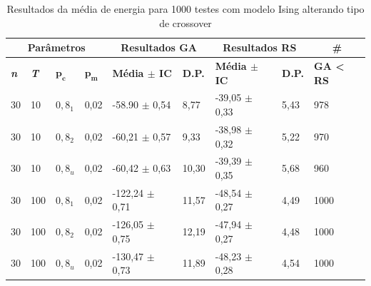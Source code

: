 \begin{table}[h!]
	\centering
	\begin{tabular}{|l|l|l|l|l|l|l|l|l|}
		\hline
		\multicolumn{4}{|c|}{\textbf{Parâmetros}}                                                    & \multicolumn{2}{c|}{\textbf{Resultados GA}}                                        & \multicolumn{2}{c|}{\textbf{Resultados RS}}                                        & \multicolumn{1}{c|}{\textbf{\#}}                      \\ \hline
		\textbf{\textit{n}} & \textbf{\textit{T}} & $\bm{p_c}$ & $\bm{p_m}$ & \textbf{Média $\pm$ IC} & \textbf{D.P.} & \textbf{Média $\pm$ IC} & \textbf{D.P.} & \textbf{GA < RS} \\ \hline
		30                          & 10                          & $0,8_1$    & 0,02       & -58.90 $\pm$ 0,54                            & 8,77                           & -39,05 $\pm$ 0,33                            & 5,43                           & 978                                          \\ \hline
		30                          & 10                          & $0,8_2$    & 0,02       & -60,21 $\pm$ 0,57                            & 9,33                           & -38,98 $\pm$ 0,32                            & 5,22                           & 970                                          \\ \hline
		30                          & 10                          & $0,8_u$    & 0,02       & -60,42 $\pm$ 0,63                            & 10,30                          & -39,39 $\pm$ 0,35                            & 5,68                           & 960                                          \\ \hline
		30                          & 100                         & $0,8_1$    & 0,02       & -122,24 $\pm$ 0,71                           & 11,57                          & -48,54 $\pm$ 0,27                            & 4,49                           & 1000                                         \\ \hline
		30                          & 100                         & $0,8_2$    & 0,02       & -126,05 $\pm$ 0,75                           & 12,19                          & -47,94 $\pm$ 0,27                            & 4,48                           & 1000                                         \\ \hline
		30                          & 100                         & $0,8_u$    & 0,02       & -130,47 $\pm$ 0,73                           & 11,89                          & -48,23 $\pm$ 0,28                            & 4,54                           & 1000                                         \\ \hline
	\end{tabular}
	\caption{Resultados da média de energia para 1000 testes com modelo Ising alterando tipo de crossover}
	\label{tab:resultados_teste2}
\end{table}

